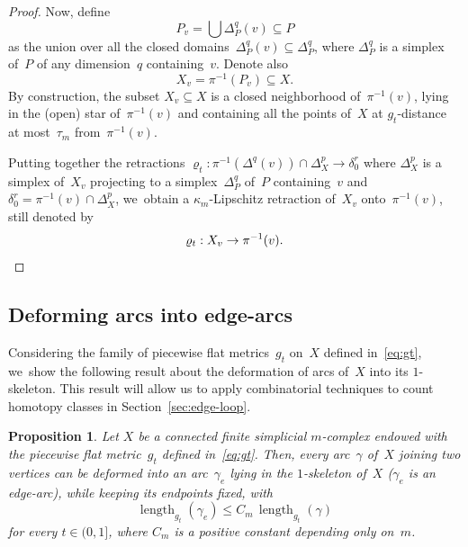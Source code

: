 \documentclass[10pt]{amsart}
\newtheorem{proposition}[theorem]{Proposition}
\theoremstyle{definition}
\DeclareMathOperator{\length}{length}
\begin{document}
\begin{proof}
Now, define
\begin{equation} \label{eq:Pv}
P_v = \bigcup \Delta_P^q(v) \subseteq P
\end{equation}
as the union over all the closed domains~$\Delta_P^q(v) \subseteq \Delta_P^q$, where $\Delta_P^q$ is a simplex of~$P$ of any dimension~$q$ containing~$v$.
Denote also
\begin{equation} \label{eq:Xv}
X_v = \pi^{-1}(P_v) \subseteq X.
\end{equation}
By construction, the subset $X_v \subseteq X$ is a closed neighborhood of~$\pi^{-1}(v)$, lying in the (open) star of~$\pi^{-1}(v)$ and containing all the points of~$X$ at $g_t$-distance at most~$\tau_m$ from~$\pi^{-1}(v)$.

Putting together the retractions $\varrho_t : \pi^{-1}(\Delta^q(v)) \cap \Delta_X^p \to \delta_0^r$ where $\Delta_X^p$ is a simplex of~$X_v$ projecting to a simplex~$\Delta_P^q$ of~$P$ containing~$v$ and $\delta_0^r= \pi^{-1}(v) \cap \Delta_X^p$, we~obtain a $\kappa_m$-Lipschitz retraction of~$X_v$ onto~$\pi^{-1}(v)$, still denoted by
\[
\varrho_t:X_v \to \pi^{-1}(v).\qedhere
\]
\end{proof}

\subsection{Deforming arcs into edge-arcs} \label{sec:deforming}

Considering the family of piecewise flat metrics~$g_t$ on~$X$ defined in~\eqref{eq:gt}, we~show the following result about the deformation of arcs of~$X$ into its $1$-skeleton.
This result will allow us to apply combinatorial techniques to count homotopy classes in Section~\ref{sec:edge-loop}.

\begin{proposition} \label{prop:deforming}
Let $X$ be a connected finite simplicial $m$\nobreakdash-complex endowed with the piecewise flat metric~$g_t$ defined in~\eqref{eq:gt}.
Then, every arc~$\gamma$ of~$X$ joining two vertices can be deformed into an arc~$\gamma_e$ lying in the $1$-skeleton of~$X$ (\ie $\gamma_e$ is an edge-arc), while keeping its endpoints fixed, with
\begin{equation} \label{eq:deforming}
\length_{g_t}(\gamma_e) \leq C_m \, \length_{g_t}(\gamma)
\end{equation}
for every $t \in (0,1]$, where $C_m$ is a positive constant depending only on~$m$.
\end{proposition}
\end{document}
